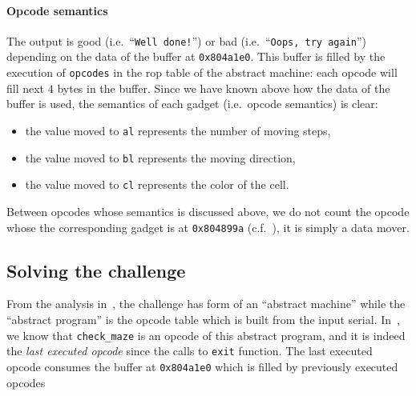 \documentclass{easychair}
\begin{document}
\paragraph{Opcode semantics}
The output is good (i.e.~``\texttt{Well done!}'') or bad (i.e.~``\texttt{Oops, try again}'') depending on the data of the buffer at \texttt{0x804a1e0}. This buffer is filled by the execution of \texttt{opcodes} in the rop table of the abstract machine: each opcode will fill next $4$ bytes in the buffer. Since we have known above how the data of the buffer is used, the semantics of each gadget (i.e.~opcode semantics) is clear:
\begin{itemize}
\item the value moved to \texttt{al} represents the number of moving steps,
\item the value moved to \texttt{bl} represents the moving direction,
\item the value moved to \texttt{cl} represents the color of the cell.
\end{itemize}

\begin{remark}
  Between opcodes whose semantics is discussed above, we do not count the opcode whose the corresponding gadget is at \texttt{0x804899a} (c.f.~), it is simply a data mover.
\end{remark}


\subsection{Solving the challenge}
\label{sec:solving}
From the analysis in~, the challenge has form of an ``abstract machine'' while the ``abstract program'' is the opcode table which is built from the input serial. In~, we know that \texttt{check\_maze} is an opcode of this abstract program, and it is indeed the \emph{last executed opcode} since the calls to \texttt{exit} function. The last executed opcode consumes the buffer at \texttt{0x804a1e0} which is filled by previously executed opcodes
\end{document}
